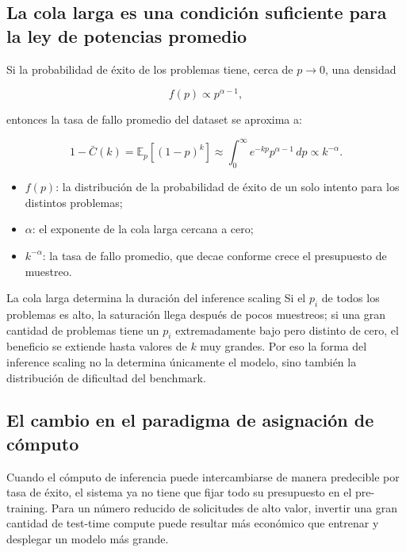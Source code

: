 \subsection{La cola larga es una condición suficiente para la ley de potencias promedio}

Si la probabilidad de éxito de los problemas tiene, cerca de $p\rightarrow0$, una densidad

$$
f(p)\propto p^{\alpha-1},
$$

entonces la tasa de fallo promedio del dataset se aproxima a:

$$
1-\bar C(k)=\mathbb{E}_{p}[(1-p)^k]
\approx\int_{0}^{\infty} e^{-kp}p^{\alpha-1}\,dp
\propto k^{-\alpha}.
$$

\begin{itemize}
    \item $f(p)$: la distribución de la probabilidad de éxito de un solo intento para los distintos problemas;
    \item $\alpha$: el exponente de la cola larga cercana a cero;
    \item $k^{-\alpha}$: la tasa de fallo promedio, que decae conforme crece el presupuesto de muestreo.
\end{itemize}


\begin{importantbox}{La cola larga determina la duración del inference scaling}
Si el $p_i$ de todos los problemas es alto, la saturación llega después de pocos muestreos; si una gran cantidad de problemas tiene un $p_i$ extremadamente bajo pero distinto de cero, el beneficio se extiende hasta valores de $k$ muy grandes. Por eso la forma del inference scaling no la determina únicamente el modelo, sino también la distribución de dificultad del benchmark.
\end{importantbox}

\subsection{El cambio en el paradigma de asignación de cómputo}

Cuando el cómputo de inferencia puede intercambiarse de manera predecible por tasa de éxito, el sistema ya no tiene que fijar todo su presupuesto en el pre-training. Para un número reducido de solicitudes de alto valor, invertir una gran cantidad de test-time compute puede resultar más económico que entrenar y desplegar un modelo más grande.

